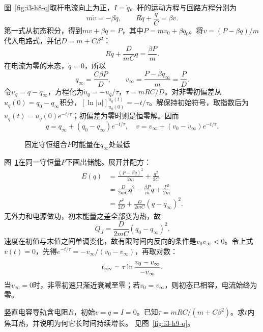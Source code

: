 \begin{solution}
图~\ref{fig:i3-h8-q}取杆电流向上为正，$I=\dot q$。杆的运动方程与回路方程分别为
\[
m\dot v=-\beta\dot q,\qquad R\dot q+\frac qC=\beta v.
\]
第一式从初态积分，得到$mv+\beta q=P$，其中$P=mv_0+\beta q_0$。将$v=(P-\beta q)/m$代入电路式，并记$D=m+C\beta^2$：
\[
R\dot q+\frac{D}{mC}q=\frac{\beta P}{m}.
\]
在电流为零的末态，$\dot q=0$，所以
\[
q_\infty=\frac{C\beta P}{D},\qquad
v_\infty=\frac{P-\beta q_\infty}{m}=\frac PD.
\]
令$u_q=q-q_\infty$，方程化为$\dot u_q=-u_q/\tau$，$\tau=mRC/D$。对非零初偏差从$u_q(0)=q_0-q_\infty$积分，$[\ln|u|]_{u_q(0)}^{u_q(t)}=-t/\tau$。解保持初始符号，取指数后为$u_q(t)=u_q(0)e^{-t/\tau}$；初偏差为零时则是恒零解。因而
\[
q=q_\infty+(q_0-q_\infty)e^{-t/\tau},\quad
v=v_\infty+(v_0-v_\infty)e^{-t/\tau}.
\]
\begin{figure}[H]\centering
{}
\caption{固定守恒组合$P$时能量在$q_\infty$处最低}\label{fig:i3-h8-s}
\end{figure}
图~\ref{fig:i3-h8-s}在同一守恒量$P$下画出储能。展开并配方：
\[
\begin{aligned}
E(q)&=\frac{(P-\beta q)^2}{2m}+\frac{q^2}{2C}\\
&=\frac{D}{2mC}q^2-\frac{\beta P}{m}q+\frac{P^2}{2m}\\
&=\frac{P^2}{2D}+\frac{D}{2mC}(q-q_\infty)^2.
\end{aligned}
\]
无外力和电源做功，初末能量之差全部变为热，故
\[
\boxed{Q_J=\frac{D}{2mC}(q_0-q_\infty)^2}.
\]
速度在初值与末值之间单调变化，故有限时间内反向的条件是$v_0v_\infty<0$。令上式$v(t)=0$，先得$e^{-t/\tau}=-v_\infty/(v_0-v_\infty)$，再取对数：
\[
t_{\rm rev}=\tau\ln\frac{v_0-v_\infty}{-v_\infty}.
\]
当$v_\infty=0$时，非零初速只渐近衰减至零；若$v_0=v_\infty$，则初态已相容，电流始终为零。
\end{solution}

\begin{exercise}[竖直电容导轨的耗散量]\label{ex:i3-h9}
竖直电容导轨含电阻$R$，初始$v=q=I=0$。已知$\tau=mRC/(m+C\beta^2)$。求$t$内焦耳热，并说明为何它长时间持续增长。 见图~\ref{fig:i3-h9-q}。
\end{exercise}

